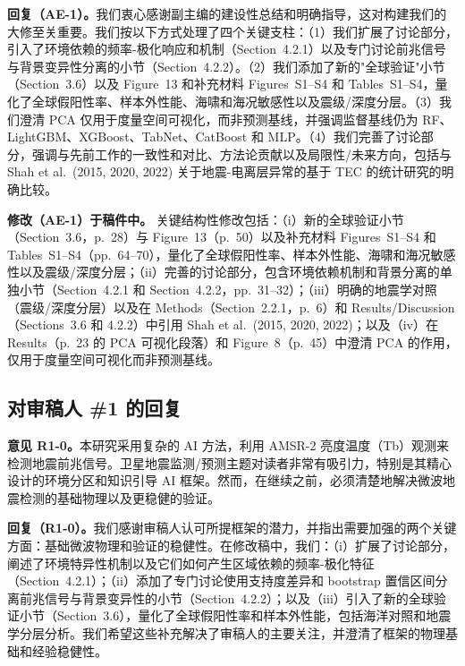 \documentclass[12pt]{article}
\newcommand{\revcomment}[1]{\begingroup\color{commentcolor}#1\endgroup}
\newcommand{\revresponse}[1]{\begingroup\color{responsecolor}#1\endgroup}
\newcommand{\revchange}[1]{\begingroup\color{changecolor}#1\endgroup}
\begin{document}
\revresponse{%
\textbf{回复（AE-1）。}我们衷心感谢副主编的建设性总结和明确指导，这对构建我们的大修至关重要。我们按以下方式处理了四个关键支柱：（1）我们扩展了讨论部分，引入了环境依赖的频率-极化响应和机制（Section~4.2.1）以及专门讨论前兆信号与背景变异性分离的小节（Section~4.2.2）。（2）我们添加了新的"全球验证"小节（Section~3.6）以及 Figure~13 和补充材料 Figures~S1--S4 和 Tables~S1--S4，量化了全球假阳性率、样本外性能、海啸和海况敏感性以及震级/深度分层。（3）我们澄清 PCA 仅用于度量空间可视化，而非预测基线，并强调监督基线仍为 RF、LightGBM、XGBoost、TabNet、CatBoost 和 MLP。（4）我们完善了讨论部分，强调与先前工作的一致性和对比、方法论贡献以及局限性/未来方向，包括与 Shah et al.~(2015, 2020, 2022) 关于地震-电离层异常的基于 TEC 的统计研究的明确比较。
}

\revchange{%
\textbf{修改（AE-1）于稿件中。}
关键结构性修改包括：（i）新的全球验证小节（Section~3.6，p.~28）与 Figure~13（p.~50）以及补充材料 Figures~S1--S4 和 Tables~S1--S4（pp.~64--70），量化了全球假阳性率、样本外性能、海啸和海况敏感性以及震级/深度分层；（ii）完善的讨论部分，包含环境依赖机制和背景分离的单独小节（Section~4.2.1 和 Section~4.2.2，pp.~31--32）；（iii）明确的地震学对照（震级/深度分层）以及在 Methods（Section~2.2.1，p.~6）和 Results/Discussion（Sections~3.6 和 4.2.2）中引用 Shah et al.~(2015, 2020, 2022)；以及（iv）在 Results（p.~23 的 PCA 可视化段落）和 Figure~8（p.~45）中澄清 PCA 的作用，仅用于度量空间可视化而非预测基线。}

\subsection*{对审稿人 \#1 的回复}

\revcomment{%
\textbf{意见 R1-0。}本研究采用复杂的 AI 方法，利用 AMSR-2 亮度温度（Tb）观测来检测地震前兆信号。卫星地震监测/预测主题对读者非常有吸引力，特别是其精心设计的环境分区和知识引导 AI 框架。然而，在继续之前，必须清楚地解决微波地震检测的基础物理以及更稳健的验证。
}

\revresponse{%
\textbf{回复（R1-0）。}我们感谢审稿人认可所提框架的潜力，并指出需要加强的两个关键方面：基础微波物理和验证的稳健性。在修改稿中，我们：（i）扩展了讨论部分，阐述了环境特异性机制以及它们如何产生区域依赖的频率-极化特征（Section~4.2.1）；（ii）添加了专门讨论使用支持度差异和 bootstrap 置信区间分离前兆信号与背景变异性的小节（Section~4.2.2）；以及（iii）引入了新的全球验证小节（Section~3.6），量化了全球假阳性率和样本外性能，包括海洋对照和地震学分层分析。我们希望这些补充解决了审稿人的主要关注，并澄清了框架的物理基础和经验稳健性。
}
\end{document}
